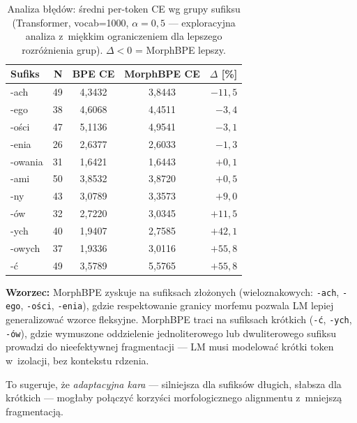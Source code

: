 \begin{table}[h]
  \centering
  \caption{Analiza błędów: średni per-token CE wg grupy sufiksu
  (Transformer, vocab=1000, $\alpha = 0{,}5$ --- exploracyjna analiza
  z~miękkim ograniczeniem dla lepszego rozróżnienia grup).
  $\Delta < 0$ = MorphBPE lepszy.}
  \label{tab:errors}
  \small
  \begin{tabular}{lrccr}
    \toprule
    Sufiks & N & BPE CE & MorphBPE CE & $\Delta$ [\%] \\
    \midrule
    \rowcolor{slayergreen!20}
    -ach    & 49 & 4{,}3432 & 3{,}8443 & $-11{,}5$ \\
    \rowcolor{slayergreen!20}
    -ego    & 38 & 4{,}6068 & 4{,}4511 & $-3{,}4$ \\
    \rowcolor{slayergreen!20}
    -ości   & 47 & 5{,}1136 & 4{,}9541 & $-3{,}1$ \\
    \rowcolor{slayergreen!20}
    -enia   & 26 & 2{,}6377 & 2{,}6033 & $-1{,}3$ \\
    -owania & 31 & 1{,}6421 & 1{,}6443 & $+0{,}1$ \\
    -ami    & 50 & 3{,}8532 & 3{,}8720 & $+0{,}5$ \\
    \rowcolor{slayerred!20}
    -ny     & 43 & 3{,}0789 & 3{,}3573 & $+9{,}0$ \\
    \rowcolor{slayerred!20}
    -ów     & 32 & 2{,}7220 & 3{,}0345 & $+11{,}5$ \\
    \rowcolor{slayerred!20}
    -ych    & 40 & 1{,}9407 & 2{,}7585 & $+42{,}1$ \\
    \rowcolor{slayerred!20}
    -owych  & 37 & 1{,}9336 & 3{,}0116 & $+55{,}8$ \\
    \rowcolor{slayerred!20}
    -ć      & 49 & 3{,}5789 & 5{,}5765 & $+55{,}8$ \\
    \bottomrule
  \end{tabular}
\end{table}

\textbf{Wzorzec:} MorphBPE zyskuje na sufiksach złożonych
(wieloznakowych: \texttt{-ach}, \texttt{-ego}, \texttt{-ości},
\texttt{-enia}), gdzie respektowanie granicy morfemu pozwala LM
lepiej generalizować wzorce fleksyjne. MorphBPE traci na sufiksach
krótkich (\texttt{-ć}, \texttt{-ych}, \texttt{-ów}), gdzie wymuszone
oddzielenie jednoliterowego lub dwuliterowego sufiksu prowadzi
do nieefektywnej fragmentacji --- LM musi modelować krótki token
w~izolacji, bez kontekstu rdzenia.

To sugeruje, że \emph{adaptacyjna kara} --- silniejsza dla sufiksów
długich, słabsza dla krótkich --- mogłaby połączyć korzyści
morfologicznego alignmentu z~mniejszą fragmentacją.

